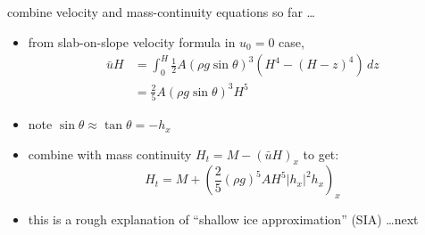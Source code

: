 \begin{frame}{combine velocity and mass-continuity equations so far \dots}

\begin{itemize}
\item from slab-on-slope velocity formula in $u_0=0$ case,
\begin{align*}
\bar u H &= \int_0^H \frac{1}{2} A (\rho g \sin\theta)^3  \left(H^4 - (H-z)^4\right)\,dz \\
	&= \frac{2}{5} A (\rho g \sin\theta)^3 H^5
\end{align*}
\item note $\sin \theta \approx \tan\theta = - h_x$
\item combine with mass continuity $H_t = M - \left(\bar u H\right)_x$ to get:
  $$H_t = M + \left(\frac{2}{5} (\rho g)^5 A H^5 |h_x|^2 h_x\right)_x$$

\medskip
\item this is a rough explanation of ``shallow ice approximation'' (SIA) \dots next
\end{itemize}
\end{frame}

